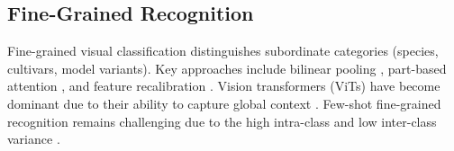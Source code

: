 \subsection{Fine-Grained Recognition}

Fine-grained visual classification distinguishes subordinate categories
(species, cultivars, model variants). Key approaches include bilinear
pooling \citep{lin2015bilinear}, part-based attention
\citep{zheng2017learning}, and feature recalibration
\citep{hu2018squeeze}. Vision transformers (ViTs) have become dominant
due to their ability to capture global context
\citep{dosovitskiy2021image, he2022transfg}. Few-shot fine-grained
recognition remains challenging due to the high intra-class and low
inter-class variance \citep{wei2019piecewise}.


